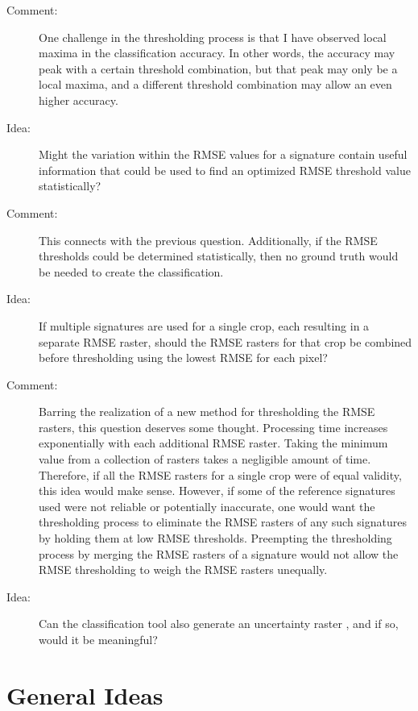 \begin{description}
\item[Comment:] One challenge in the thresholding process is that I have observed local maxima in the classification accuracy. In other words, the accuracy may peak with a certain threshold combination, but that peak may only be a local maxima, and a different threshold combination may allow an even higher accuracy.

\item[Idea:] Might the variation within the RMSE values for a signature contain useful information that could be used to find an optimized RMSE threshold value statistically?

\item[Comment:] This connects with the previous question. Additionally, if the RMSE thresholds could be determined statistically, then no ground truth would be needed to create the classification.

\item[Idea:] If multiple signatures are used for a single crop, each resulting in a separate RMSE raster, should the RMSE rasters for that crop be combined before thresholding using the lowest RMSE for each pixel?

\item[Comment:] Barring the realization of a new method for thresholding the RMSE rasters, this question deserves some thought. Processing time increases exponentially with each additional RMSE raster. Taking the minimum value from a collection of rasters takes a negligible amount of time. Therefore, if all the RMSE rasters for a single crop were of equal validity, this idea would make sense. However, if some of the reference signatures used were not reliable or potentially inaccurate, one would want the thresholding process to eliminate the RMSE rasters of any such signatures by holding them at low RMSE thresholds. Preempting the thresholding process by merging the RMSE rasters of a signature would not allow the RMSE thresholding to weigh the RMSE rasters unequally.

\item[Idea:] Can the classification tool also generate an uncertainty raster \autocite[see][pages 190-191]{eastman2012idrisi}, and if so, would it be meaningful?
\end{description}


\section{General Ideas}


